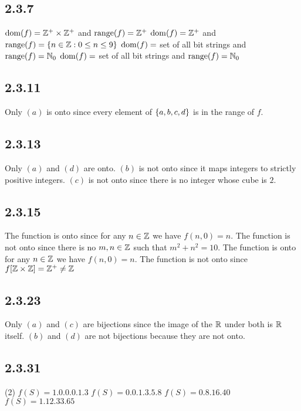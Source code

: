 \documentclass[12pt,titlepage]{extarticle}
\begin{document}
\subsection*{2.3.7}
\begin{tasks}
    \task $\operatorname{dom}(f) = \mathbb{Z}^+ \times \mathbb{Z}^+$ and $\operatorname{range}(f) = \mathbb{Z}^+$
    \task $\operatorname{dom}(f) = \mathbb{Z}^+$ and $\operatorname{range}(f) = \qty{n \in \mathbb{Z}: 0 \leq n \leq 9}$
    \task $\operatorname{dom}(f) = $ set of all bit strings and $\operatorname{range}(f) = \mathbb{N}_0$
    \task $\operatorname{dom}(f) = $ set of all bit strings and $\operatorname{range}(f) = \mathbb{N}_0$
\end{tasks}

\subsection*{2.3.11}
Only $(a)$ is onto since every element of $\qty{a,b,c,d}$ is in the range of $f$.

\subsection*{2.3.13}
Only $(a)$ and $(d)$ are onto. $(b)$ is not onto since it maps integers to strictly positive integers. $(c)$ is not onto since there is no integer whose cube is $2$.

\subsection*{2.3.15}
\begin{tasks}
    \task The function is onto since for any $n \in \mathbb{Z}$ we have $f(n, 0) = n$.
    \task The function is not onto since there is no $m,n \in \mathbb{Z}$ such that $m^2 + n^2 = 10$.
    \task The function is onto for any $n \in \mathbb{Z}$ we have $f(n, 0) = n$.
    \task The function is not onto since $f[\mathbb{Z} \times \mathbb{Z}] = \mathbb{Z}^+ \neq \mathbb{Z}$
\end{tasks}

\subsection*{2.3.23}
Only $(a)$ and $(c)$ are bijections since the image of the $\mathbb{R}$ under both is $\mathbb{R}$ itself. $(b)$ and $(d)$ are not bijections because they are not onto.

\subsection*{2.3.31}
\begin{tasks}(2)
    \task $f(S) = \qty{1, 0, 0, 0, 1, 3}$
    \task $f(S) = \qty{0, 0, 1, 3, 5, 8}$
    \task $f(S) = \qty{0, 8, 16, 40}$
    \task $f(S) = \qty{1, 12, 33, 65}$
\end{tasks}
\end{document}
